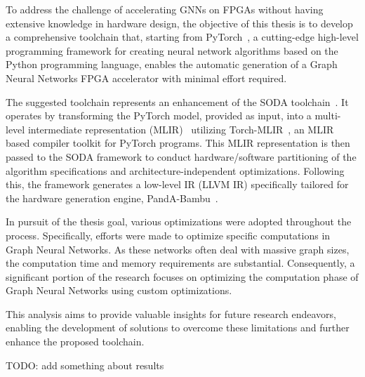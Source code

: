 To address the challenge of accelerating GNNs on FPGAs without having extensive knowledge in hardware design, the objective of this thesis is to develop a comprehensive toolchain that, starting from PyTorch~\cite{DBLP:journals/corr/abs-1912-01703},
a cutting-edge high-level programming framework for creating neural network algorithms based on the Python programming language, enables the
automatic generation of a Graph Neural Networks FPGA accelerator with minimal effort required.

The suggested toolchain represents an enhancement of the SODA toolchain~\cite{9786533}.
It operates by transforming the PyTorch model, provided as input, into a multi-level intermediate representation
(MLIR)~\cite{9370308} utilizing Torch-MLIR~\cite{torch_mlir}, an MLIR based compiler toolkit for PyTorch programs.
This MLIR representation is then passed to the SODA framework to conduct hardware/software partitioning of the algorithm
specifications and architecture-independent optimizations.
Following this, the framework generates a low-level IR (LLVM IR) specifically tailored for the hardware generation engine,
PandA-Bambu~\cite{9586110}.

In pursuit of the thesis goal, various optimizations were adopted throughout the process.
Specifically, efforts were made to optimize specific computations in Graph Neural Networks.
As these networks often deal with massive graph sizes, the computation time and memory requirements are substantial.
Consequently, a significant portion of the research focuses on optimizing the computation phase of Graph Neural Networks using
custom optimizations.

This analysis aims to provide valuable insights for future research endeavors, enabling the development of solutions
to overcome these limitations and further enhance the proposed toolchain.

TODO: add something about results

%

